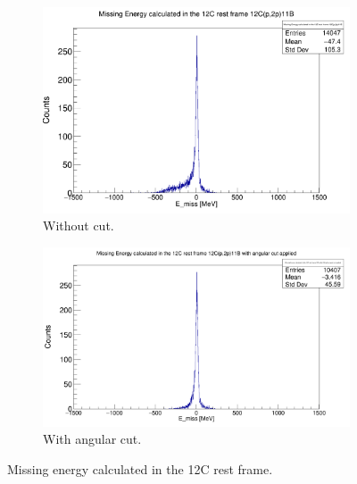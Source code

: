 \documentclass{report}
\begin{document}
\begin{figure}[ht]
\begin{subfigure}{.5\textwidth}
  \centering
  \includegraphics[width=\linewidth]{missing_E_12C_11B.png}
  \caption{Without cut.}
  \label{fig:sub-first}
\end{subfigure}
\begin{subfigure}{.5\textwidth}
  \centering
  \includegraphics[width=\linewidth]{missing_E_12C_11B_cut.png}
  \caption{With angular cut.}
  \label{fig:sub-second}
\end{subfigure}
\caption{Missing energy calculated in the 12C rest frame.}
\label{fig:missing_mom_11B_z_comp_cut}
\end{figure}
\end{document}
